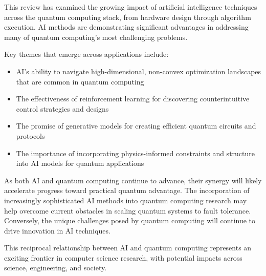 This review has examined the growing impact of artificial intelligence techniques across the quantum computing stack, from hardware design through algorithm execution. AI methods are demonstrating significant advantages in addressing many of quantum computing's most challenging problems.

Key themes that emerge across applications include:

\begin{itemize}
    \item AI's ability to navigate high-dimensional, non-convex optimization landscapes that are common in quantum computing
    \item The effectiveness of reinforcement learning for discovering counterintuitive control strategies and designs
    \item The promise of generative models for creating efficient quantum circuits and protocols
    \item The importance of incorporating physics-informed constraints and structure into AI models for quantum applications
\end{itemize}

As both AI and quantum computing continue to advance, their synergy will likely accelerate progress toward practical quantum advantage. The incorporation of increasingly sophisticated AI methods into quantum computing research may help overcome current obstacles in scaling quantum systems to fault tolerance. Conversely, the unique challenges posed by quantum computing will continue to drive innovation in AI techniques.

This reciprocal relationship between AI and quantum computing represents an exciting frontier in computer science research, with potential impacts across science, engineering, and society. 